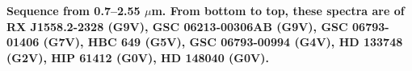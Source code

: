 {\bf Sequence from 0.7–2.55 $\mu$m. From bottom to top, these spectra are of RX J1558.2-2328 (G9V), GSC 06213-00306AB (G9V), GSC 06793-01406 (G7V), HBC 649 (G5V), GSC 06793-00994 (G4V), HD 133748 (G2V), HIP 61412 (G0V), HD 148040 (G0V).\label{fig:stack-plot-g}}
